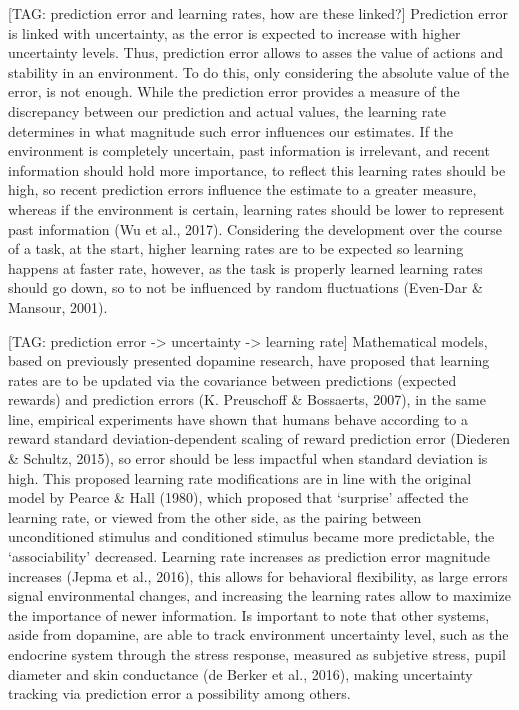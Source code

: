 \documentclass[
]{/home/nicoluarte/Downloads/templates/PNAS-template-main.tex}
\begin{document}
{[}TAG: prediction error and learning rates, how are these linked?{]}
Prediction error is linked with uncertainty, as the error is expected to
increase with higher uncertainty levels. Thus, prediction error allows
to asses the value of actions and stability in an environment. To do
this, only considering the absolute value of the error, is not enough.
While the prediction error provides a measure of the discrepancy between
our prediction and actual values, the learning rate determines in what
magnitude such error influences our estimates. If the environment is
completely uncertain, past information is irrelevant, and recent
information should hold more importance, to reflect this learning rates
should be high, so recent prediction errors influence the estimate to a
greater measure, whereas if the environment is certain, learning rates
should be lower to represent past information (Wu et al., 2017).
Considering the development over the course of a task, at the start,
higher learning rates are to be expected so learning happens at faster
rate, however, as the task is properly learned learning rates should go
down, so to not be influenced by random fluctuations (Even-Dar \&
Mansour, 2001).

{[}TAG: prediction error -\textgreater{} uncertainty -\textgreater{}
learning rate{]} Mathematical models, based on previously presented
dopamine research, have proposed that learning rates are to be updated
via the covariance between predictions (expected rewards) and prediction
errors (K. Preuschoff \& Bossaerts, 2007), in the same line, empirical
experiments have shown that humans behave according to a reward standard
deviation-dependent scaling of reward prediction error (Diederen \&
Schultz, 2015), so error should be less impactful when standard
deviation is high. This proposed learning rate modifications are in line
with the original model by Pearce \& Hall (1980), which proposed that
`surprise' affected the learning rate, or viewed from the other side, as
the pairing between unconditioned stimulus and conditioned stimulus
became more predictable, the `associability' decreased. Learning rate
increases as prediction error magnitude increases (Jepma et al., 2016),
this allows for behavioral flexibility, as large errors signal
environmental changes, and increasing the learning rates allow to
maximize the importance of newer information. Is important to note that
other systems, aside from dopamine, are able to track environment
uncertainty level, such as the endocrine system through the stress
response, measured as subjetive stress, pupil diameter and skin
conductance (de Berker et al., 2016), making uncertainty tracking via
prediction error a possibility among others.
\end{document}
